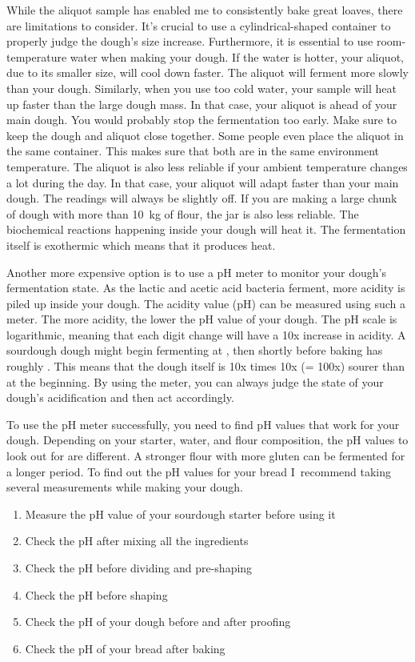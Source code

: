 While the aliquot sample has enabled me to consistently bake
great loaves, there are limitations to consider. It's crucial
to use a cylindrical-shaped container to properly judge
the dough's size increase. Furthermore, it is essential
to use room-temperature water when making your dough. If the
water is hotter, your aliquot, due to its smaller size,
will cool down faster. The aliquot will ferment more slowly
than your dough. Similarly, when you use too cold water,
your sample will heat up faster than the large dough mass.
In that case, your aliquot is ahead of your main dough. You
would probably stop the fermentation too early. Make sure
to keep the dough and aliquot close together. Some people even
place the aliquot in the same container. This makes sure that
both are in the same environment temperature. The aliquot
is also less reliable if your ambient temperature changes
a lot during the day. In that case, your aliquot will adapt
faster than your main dough. The readings will always be slightly
off. If you are making a large chunk of dough with more
than \qty{10}{\kg} of flour, the jar is also less reliable. The biochemical
reactions happening inside your dough will heat it.
The fermentation itself is exothermic which means
that it produces heat.

Another more expensive option is to use a pH meter
to monitor your dough's fermentation state. As the lactic
and acetic acid bacteria ferment, more acidity is piled
up inside your dough. The acidity value (pH) can be
measured using such a meter. The more acidity, the lower the pH
value of your dough. The pH scale is logarithmic, meaning
that each digit change will have a 10x increase in acidity.
A sourdough dough might begin fermenting at ,
then shortly before baking has roughly . This means
that the dough itself is 10x times 10x (= 100x) sourer
than at the beginning. By using the meter, you can always
judge the state of your dough's acidification and then act
accordingly.

To use the pH meter successfully, you need to find pH values
that work for your dough. Depending on your starter,
water, and flour composition, the pH values to look out
for are different. A stronger flour with more gluten
can be fermented for a longer period. To find out
the pH values for your bread I~recommend taking
several measurements while making your dough.

\begin{enumerate}
  \item Measure the pH value of your sourdough starter before using it
  \item Check the pH after mixing all the ingredients
  \item Check the pH before dividing and pre-shaping
  \item Check the pH before shaping
  \item Check the pH of your dough before and after proofing
  \item Check the pH of your bread after baking
\end{enumerate}

